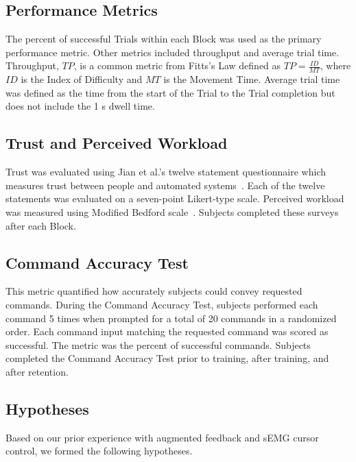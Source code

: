 \subsection{Performance Metrics}
The percent of successful Trials within each Block was used as the primary performance metric.
Other metrics included throughput and average trial time.
Throughput, $TP$, is a common metric from Fitts's Law defined as $TP = \frac{ID}{MT}$, where $ID$ is the Index of Difficulty and $MT$ is the Movement Time.
Average trial time was defined as the time from the start of the Trial to the Trial completion but does not include the 1 s dwell time.

\subsection{Trust and Perceived Workload}
Trust was evaluated using Jian et al.'s twelve statement questionnaire which measures trust between people and automated systems~\cite{jian_foundations_2000}.
Each of the twelve statements was evaluated on a seven-point Likert-type scale.
Perceived workload was measured using Modified Bedford scale~\cite{roscoe_subjective_1990}.
Subjects completed these surveys after each Block.

\subsection{Command Accuracy Test}
This metric quantified how accurately subjects could convey requested commands.
During the Command Accuracy Test, subjects performed each command 5 times when prompted for a total of 20 commands in a randomized order.
Each command input matching the requested command was scored as successful.
The metric was the percent of successful commands.
Subjects completed the Command Accuracy Test prior to training, after training, and after retention.

\subsection{Hypotheses}
Based on our prior experience with augmented feedback and sEMG cursor control, we formed the following hypotheses.

